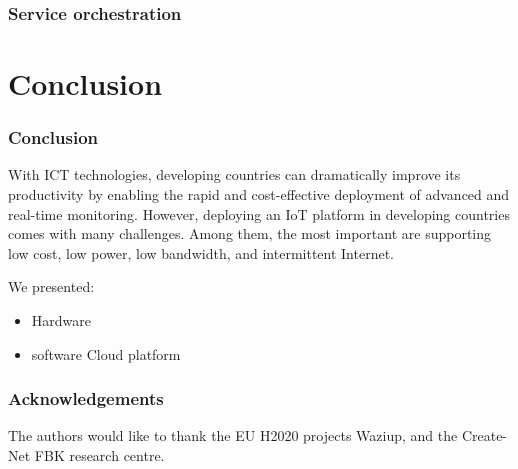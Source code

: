 \documentclass{beamer}
\begin{document}
\begin{frame}
\frametitle{Service orchestration}

\end{frame}



\section{Conclusion}

\begin{frame}
\frametitle{Conclusion}
  
With ICT technologies, developing countries can dramatically improve its productivity by enabling the rapid and cost-effective deployment of advanced and real-time monitoring.
However, deploying an IoT platform in developing countries comes with many challenges.
Among them, the most important are supporting low cost, low power, low bandwidth, and intermittent Internet.

We presented:
  \begin{itemize}
    \item Hardware
    \item software Cloud platform 
  \end{itemize}

\end{frame}


\begin{frame}
\frametitle{Acknowledgements}

The authors would like to thank the EU H2020 projects Waziup, and the Create-Net FBK research centre. \\

\end{frame}
\end{document}
